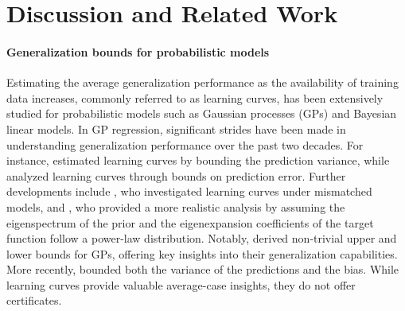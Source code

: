 \section{Discussion and Related Work}
\label{sec:related_works}






\paragraph{Generalization bounds for probabilistic models} 
Estimating the average generalization performance as the availability of training data increases, commonly referred to as learning curves, has been extensively studied for probabilistic models such as Gaussian processes (GPs) and Bayesian linear models. 
In GP regression, significant strides have been made in understanding generalization performance over the past two decades. For instance, \citet{sollich2002learning, sollich1998learning} estimated learning curves by bounding the prediction variance, while \citet{opper1998general} analyzed learning curves through bounds on prediction error. Further developments include \citet{sollich2001gaussian}, who investigated learning curves under mismatched models, 
and \citet{jin2022learning}, who provided a more realistic analysis by assuming the eigenspectrum of the prior and the eigenexpansion coefficients of the target function follow a power-law distribution.
Notably, \citet{williams2000upper} derived non-trivial upper and lower bounds for GPs, offering key insights into their generalization capabilities. More recently, \citet{savvides2024error} bounded both the variance of the predictions and the bias.
While learning curves provide valuable average-case insights, they do not offer certificates. 





